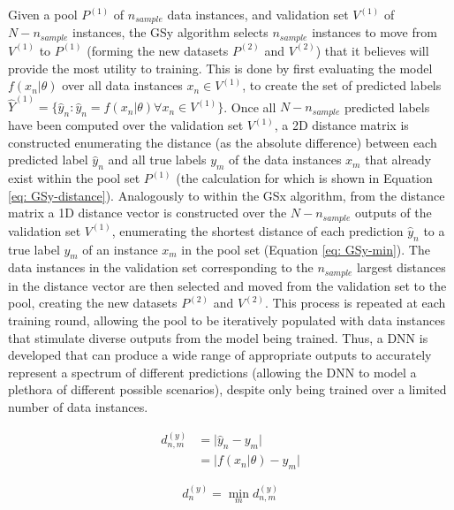 \documentclass[a4paper, 11pt]{report}
\begin{document}
    Given a pool $P^{(1)}$ of $n_{sample}$ data instances, and validation set $V^{(1)}$ of $N - n_{sample}$ instances, the GSy algorithm selects $n_{sample}$ instances to move from $V^{(1)}$ to $P^{(1)}$ (forming the new datasets $P^{(2)}$ and $V^{(2)}$) that it believes will provide the most utility to training. This is done by first evaluating the model $f( x_n \vert \theta )$ over all data instances $x_n \in V^{(1)}$, to create the set of predicted labels $\hat{Y}^{(1)} = \{ \hat{y}_n \colon \hat{y}_n = f( x_n \vert \theta ) \forall x_n \in V^{(1)} \}$. Once all $N - n_{sample}$ predicted labels have been computed over the validation set $V^{(1)}$, a 2D distance matrix is constructed enumerating the distance (as the absolute difference) between each predicted label $\hat{y}_n$ and all true labels $y_m$ of the data instances $x_m$ that already exist within the pool set $P^{(1)}$ (the calculation for which is shown in Equation \ref{eq: GSy-distance}). Analogously to within the GSx algorithm, from the distance matrix a 1D distance vector is constructed over the $N - n_{sample}$ outputs of the validation set $V^{(1)}$, enumerating the shortest distance of each prediction $\hat{y}_n$ to a true label $y_m$ of an instance $x_m$ in the pool set (Equation \ref{eq: GSy-min}). The data instances in the validation set corresponding to the $n_{sample}$ largest distances in the distance vector are then selected and moved from the validation set to the pool, creating the new datasets $P^{(2)}$ and $V^{(2)}$. This process is repeated at each training round, allowing the pool to be iteratively populated with data instances that stimulate diverse outputs from the model being trained. Thus, a DNN is developed that can produce a wide range of appropriate outputs to accurately represent a spectrum of different predictions (allowing the DNN to model a plethora of different possible scenarios), despite only being trained over a limited number of data instances.


    \begin{align}
        \label{eq: GSy-distance}
        d^{(y)}_{n, m} &= \lvert \hat{y}_n - y_m \lvert \\
        &= \lvert f( x_n \vert \theta ) - y_m \lvert
    \end{align}
  
    \begin{equation}
        \label{eq: GSy-min}
        d^{(y)}_n = \min_m d^{(y)}_{n, m}
    \end{equation}
\end{document}
